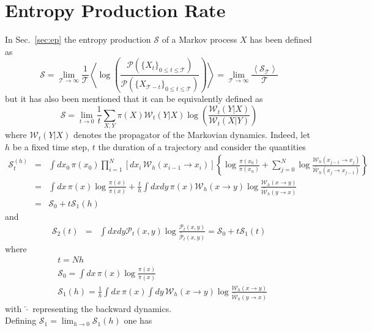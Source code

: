 \documentclass[12pt]{iopart}
\newcommand{\lx} {\left}
\newcommand{\rx} {\right}
\newcommand{\ave}[1] {\lx\langle #1 \rx\rangle}
\newcommand{\cP} {\mathcal{P}}
\newcommand{\cW} {\mathcal{W}}
\newcommand{\cS} {\mathcal{S}}
\newcommand{\cT} {\mathcal{T}}
\begin{document}
\section{Entropy Production Rate}\label{appendix:EPR}

In Sec.~\ref{sec:ep} the entropy production $\cS$ of a Markov process $X$ has been defined as 
\begin{equation}
    \cS=\lim_{\cT\to\infty}\frac{1}{\cT}\ave{\log\lx(\frac{\cP(\{X_t\}_{0\le t \le \cT})}{\cP(\{ X_{\cT - t}\}_{0 \le t \le \cT})}\rx)}=\lim_{\cT\to\infty} \frac{\ave{\cS_\cT}}{\cT}
\end{equation}
but it has also been mentioned that it can be equivalently defined as 
\begin{equation}
\cS=\lim_{t\to 0} \frac{1}{t}\sum_{X,Y}\pi(X)\cW_t(Y|X)\log\lx(\frac{\cW_t(Y|X)}{\cW_t(X|Y)}\rx)
\label{eq:epr_zero_limit}
\end{equation}
where $\cW_t(Y|X)$ denotes the propagator of the Markovian dynamics.
Indeed, let $h$ be a fixed time step, $t$ the duration of a trajectory and consider the quantities
\begin{eqnarray}
    \cS_t^{(h)} &=& \int dx_0\, \pi(x_0) \prod_{i=1}^N \lx[dx_i\, \cW_h(x_{i-1} \to  x_i) \rx] 
    \lx\{ \log{\frac{\pi(x_0)}{\overleftarrow{\pi}(x_n)}} + \sum_{j=0}^N \log{\frac{\cW_h(x_{j-1} \to  x_j)}{\overleftarrow{\cW_h}(x_j \to  x_{j-1})}}\rx\} \nonumber\\
    &=& \int dx\, \pi(x) \log{\frac{\pi(x)}{\overleftarrow{\pi}(x)}} + \frac{t}{h} \int dxdy\, \pi(x) \cW_h(x\to y) \log{\frac{\cW_h(x \to y)}{\overleftarrow{\cW_h}(y \to  x)}} \nonumber \\
    &=& \cS_0 + t \cS_1(h)
\end{eqnarray}
and 
\begin{eqnarray}    
    \cS_2(t) &=& \int dx dy \cP_t(x,y) \log{\frac{\cP_t(x,y)}{\overleftarrow{\cP_t}(x,y)}} = \cS_0 + t \cS_1(t)
\end{eqnarray}
where
\begin{eqnarray}
    &t = Nh \\
    &\cS_0 = \int dx\, \pi(x) \log{\frac{\pi(x)}{\overleftarrow{\pi}(x)}} \\
    &\cS_1(h) = \frac{1}{h} \int dx \, \pi(x) \int dy \, \cW_h(x\to y) \log{\frac{\cW_h(x\to y)}{\overleftarrow{\cW_h}(y \to x)}}
\end{eqnarray}
with $\overleftarrow{\cdot}$ representing the backward dynamics.\\
Defining $\cS_1 = \lim_{h \to 0} \cS_1(h)$ one has
\end{document}
